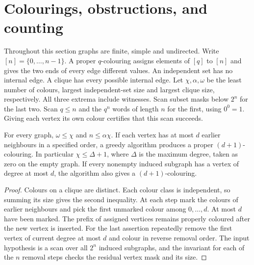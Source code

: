 \section{Colourings, obstructions, and counting}\label{co:color}

Throughout this section graphs are finite, simple and undirected. Write
$[n]=\{0,\ldots,n-1\}$. A proper $q$-colouring assigns elements of $[q]$ to
$[n]$ and gives the two ends of every edge different values. An independent set
has no internal edge. A clique has every possible internal edge. Let
$\chi,\alpha,\omega$ be the least number of colours, largest independent-set
size and largest clique size, respectively. All three extrema include witnesses.
Scan subset masks below $2^n$ for the last two. Scan $q\le n$ and the
$q^n$ words of length $n$ for the first, using $0^0=1$.
Giving each vertex its own colour certifies that this scan succeeds.

\begin{proposition}\leavevmode\label{co:greedy}
For every graph, $\omega\le\chi$ and $n\le\alpha\chi$.
If each vertex has at most $d$ earlier neighbours in a specified order,
a greedy algorithm produces a proper $(d+1)$-colouring. In particular
$\chi\le\Delta+1$, where $\Delta$ is the maximum degree, taken as zero on the
empty graph. If every nonempty induced subgraph has a vertex of degree at
most $d$, the algorithm also gives a $(d+1)$-colouring.
\end{proposition}
\begin{proof}
Colours on a clique are distinct. Each colour class is independent, so summing
its size gives the second inequality. At each step mark the colours of earlier
neighbours and pick the first unmarked colour among $0,\ldots,d$. At most
$d$ have been marked. The prefix of assigned vertices remains properly
coloured after the new vertex is inserted. For the last assertion repeatedly
remove the first vertex of current degree at most $d$ and colour in reverse
removal order. The input hypothesis is a scan over all $2^n$ induced
subgraphs, and the invariant for each of the $n$ removal steps checks the
residual vertex mask and its size.
\end{proof}

